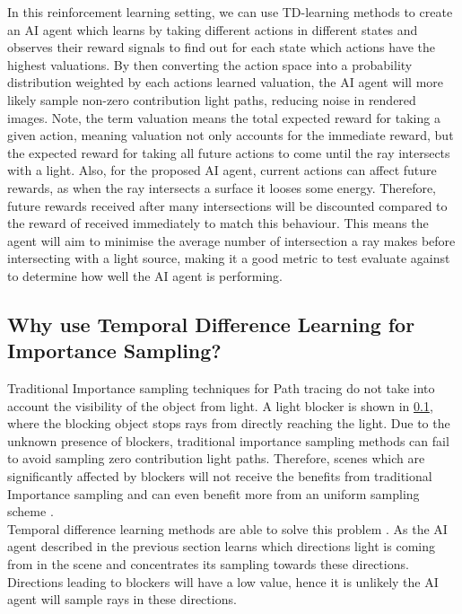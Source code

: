 \documentclass[ %
                    author={Callum Pearce},
                supervisor={Dr. Neill Campbell},
                    degree={MEng},
                     title={How effective are Temporal difference learning methods for reducing the number of zero contribution light paths while still accurately approximating Global Illumination in Path tracing?},
                  subtitle={},
                      type={research},
                      year={2019} ]{dissertation}
\begin{document}
In this reinforcement learning setting, we can use TD-learning methods to create 
an AI agent which learns by taking different actions in different states and observes 
their reward signals to find out for each state which actions have the highest valuations.
By then converting the action space into a probability distribution weighted by each
actions learned valuation, the AI agent will more likely sample non-zero contribution 
light paths, reducing noise in rendered images. Note, the term valuation means the 
total expected reward for taking a given action, meaning valuation not only accounts 
for the immediate reward, but the expected reward for taking all future actions to come 
until the ray intersects with a light. Also, for the proposed AI agent, current actions 
can affect future rewards, as when the ray intersects a surface it looses some energy. 
Therefore, future rewards received after many intersections will be discounted 
compared to the reward of received immediately to match this behaviour. This means 
the agent will aim to minimise the average number of intersection a ray makes before 
intersecting with a light source, making it a good metric to test evaluate against to 
determine how well the AI agent is performing.

\subsection{Why use Temporal Difference Learning for Importance Sampling?}

Traditional Importance sampling techniques for Path tracing do not take into account 
the visibility of the object from light. A light blocker is shown in \ref{}, where the 
blocking object stops rays from directly reaching the light. Due to the unknown 
presence of blockers, traditional importance sampling methods can fail to avoid 
sampling zero contribution light paths. Therefore, scenes which are significantly 
affected by blockers will not receive the benefits from traditional Importance sampling 
and can even benefit more from an uniform sampling scheme 
\cite{ramamoorthi2012theory}.\\


Temporal difference learning methods are able to solve this problem 
\cite{dahm2017learning}. As the AI agent described in the previous section learns 
which directions light is coming from in the scene and concentrates its sampling 
towards these directions. Directions leading to blockers will have a low value, 
hence it is unlikely the AI agent will sample rays in these directions.\\
\end{document}
